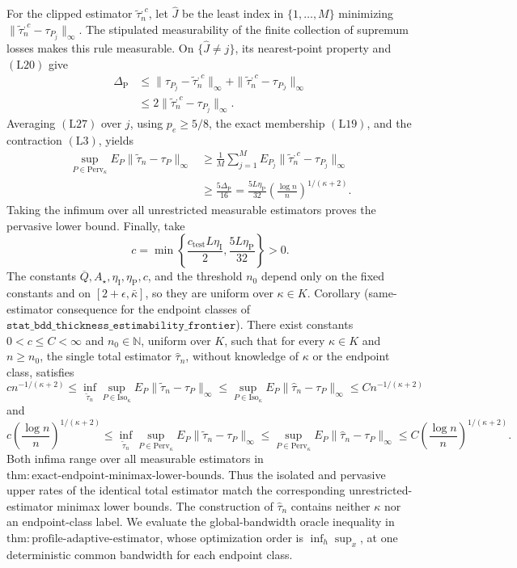 For the clipped estimator \(\widetilde\tau_n^{,c}\), let \(\widehat J\) be the least index in \(\{1,\ldots,M\}\) minimizing
\(\|\widetilde\tau_n^{,c}-\tau_{P_j}\|_\infty\).  The stipulated measurability of the finite collection of supremum losses makes this rule measurable.  On \(\{\widehat J\ne j\}\), its nearest-point property and \((\mathrm{L20})\) give
\[
\begin{aligned}
 \Delta_{\mathrm P}
 &\leq\|\tau_{P_j}-\widetilde\tau_n^{,c}\|_\infty
      +\|\widetilde\tau_n^{,c}-\tau_{P_{\widehat J}}\|_\infty\\
 &\leq2\|\widetilde\tau_n^{,c}-\tau_{P_j}\|_\infty.
\end{aligned}
 \tag{L27}
\]
Averaging \((\mathrm{L27})\) over \(j\), using \(p_e\geq5/8\), the exact membership \((\mathrm{L19})\), and the contraction \((\mathrm{L3})\), yields
\[
\begin{aligned}
 \sup_{P\in\mathrm{Perv}_\kappa}
 E_P\|\widetilde\tau_n-\tau_P\|_\infty
 &\geq\frac1M\sum_{j=1}^M
 E_{P_j}\|\widetilde\tau_n^{,c}-\tau_{P_j}\|_\infty\\
 &\geq\frac{5\Delta_{\mathrm P}}{16}
 =\frac{5L\eta_{\mathrm P}}{32}
 \left(\frac{\log n}{n}\right)^{1/(\kappa+2)}.
\end{aligned}
 \tag{L28}
\]
Taking the infimum over all unrestricted measurable estimators proves the pervasive lower bound.  Finally, take
\[
 c=\min\left\{
 \frac{c_{\mathrm{test}}L\eta_{\mathrm I}}2,
 \frac{5L\eta_{\mathrm P}}{32}
 \right\}>0.
\]
The constants \(\overline Q,A_\star,\eta_{\mathrm I},\eta_{\mathrm P},c\), and the threshold \(n_0\) depend only on the fixed constants and on
\([2+\epsilon,\bar\kappa]\), so they are uniform over \(\kappa\in K\).
Corollary (same-estimator consequence for the endpoint classes of
\(\texttt{stat\_bdd\_thickness\_estimability\_frontier}\)).  There exist constants \(0<c\leq C<\infty\) and \(n_0\in\mathbb N\), uniform over \(K\), such that for every \(\kappa\in K\) and \(n\geq n_0\), the single total estimator \(\widehat\tau_n\), without knowledge of \(\kappa\) or the endpoint class, satisfies
\[
 c n^{-1/(\kappa+2)}
 \leq
 \inf_{\widetilde\tau_n}\sup_{P\in\mathrm{Iso}_\kappa}
 E_P\|\widetilde\tau_n-\tau_P\|_\infty
 \leq
 \sup_{P\in\mathrm{Iso}_\kappa}
 E_P\|\widehat\tau_n-\tau_P\|_\infty
 \leq C n^{-1/(\kappa+2)}
\]
and
\[
 c\left(\frac{\log n}{n}\right)^{1/(\kappa+2)}
 \leq
 \inf_{\widetilde\tau_n}\sup_{P\in\mathrm{Perv}_\kappa}
 E_P\|\widetilde\tau_n-\tau_P\|_\infty
 \leq
 \sup_{P\in\mathrm{Perv}_\kappa}
 E_P\|\widehat\tau_n-\tau_P\|_\infty
 \leq C\left(\frac{\log n}{n}\right)^{1/(\kappa+2)}.
\]
Both infima range over all measurable estimators in
\(\mathrm{thm{:}exact\text{-}endpoint\text{-}minimax\text{-}lower\text{-}bounds}\).  Thus the isolated and pervasive upper rates of the identical total estimator match the corresponding unrestricted-estimator minimax lower bounds.
The construction of \(\widehat\tau_n\) contains neither \(\kappa\) nor an endpoint-class label.  We evaluate the global-bandwidth oracle inequality in
\(\mathrm{thm{:}profile\text{-}adaptive\text{-}estimator}\), whose optimization order is \(\inf_h\sup_x\), at one deterministic common bandwidth for each endpoint class.

